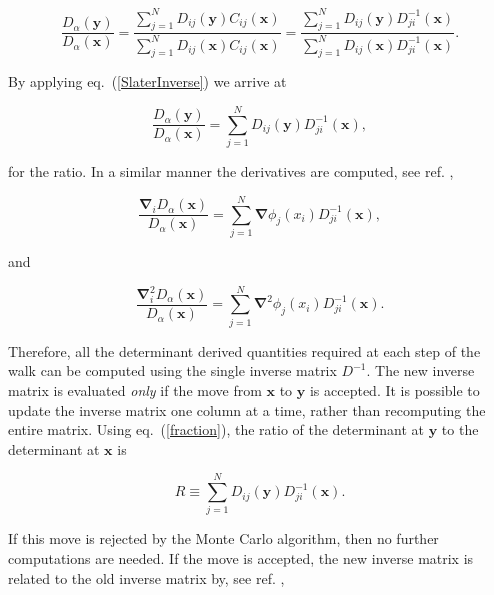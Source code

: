 \begin{equation*}
  \frac{D_{\alpha}(\mathbf{y})}{D_{\alpha}(\mathbf{x})}
  =  \frac{\sum\limits_{j=1}^N D_{ij}(\mathbf{y})C_{ij}(\mathbf{x})}
  {\sum\limits_{j=1}^N D_{ij}(\mathbf{x})C_{ij}(\mathbf{x})}
  =  \frac{\sum\limits_{j=1}^N D_{ij}(\mathbf{y})D_{ji}^{-1}(\mathbf{x})}
  {\sum\limits_{j=1}^N D_{ij}(\mathbf{x})D_{ji}^{-1}(\mathbf{x})}.
\end{equation*}

By applying eq.~(\ref{SlaterInverse}) we arrive at

\begin{equation}
  \frac{D_{\alpha}(\mathbf{y})}{D_{\alpha}(\mathbf{x})} 
  = \sum_{j=1}^N D_{ij}(\mathbf{y})D_{ji}^{-1}(\mathbf{x}),
\label{fraction}
\end{equation}

for the ratio. In a similar
manner the derivatives are computed, see ref. \cite{hammond1994},

\begin{equation}
  \frac{\mathbf{\nabla}_i D_{\alpha}(\mathbf{x})}{D_{\alpha}(\mathbf{x})}=
  \sum_{j=1}^N \mathbf{\nabla}\phi_j(x_i)D_{ji}^{-1}(\mathbf{x}),
  \label{gradPsi}
\end{equation}

and

\begin{equation}
  \frac{\mathbf{\nabla}_i^2D_{\alpha}(\mathbf{x})}{D_{\alpha}(\mathbf{x})}=
  \sum_{j=1}^N \mathbf{\nabla}^2\phi_j(x_i)D_{ji}^{-1}(\mathbf{x}).
  \label{laplacePsi}
\end{equation}

Therefore, all the determinant derived quantities required at each
step of the walk can be computed using the single inverse matrix
$D^{-1}$.
\newline
%
\newline
The new inverse matrix is evaluated \emph{only} if the move from
$\mathbf{x}$ to $\mathbf{y}$ is accepted. It is possible to update the
inverse matrix one column at a time, rather than recomputing the
entire matrix. Using eq.~(\ref{fraction}), the ratio of the
determinant at $\mathbf{y}$ to the determinant at $\mathbf{x}$ is


\begin{equation}
  R\equiv\sum_{j=1}^N D_{ij}(\mathbf{y})D_{ji}^{-1}(\mathbf{x}).
\label{ratio}
\end{equation}

If this move is rejected by the Monte Carlo algorithm, then no further
computations are needed. If the move is accepted, the new inverse
matrix is related to the old inverse matrix by, see ref. \cite{hammond1994},

